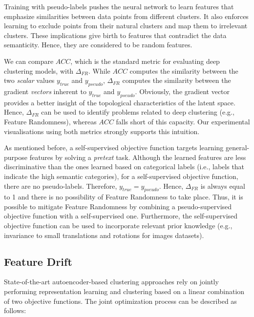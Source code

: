 \documentclass{article}
\begin{document}
Training with pseudo-labels pushes the neural network to learn features that emphasize similarities between data points from different clusters. It also enforces learning to exclude points from their natural clusters and map them to irrelevant clusters. These implications give birth to features that contradict the data semanticity. Hence, they are considered to be random features. 

We can compare $ACC$, which is the standard metric for evaluating deep clustering models, with $\Delta_{FR}$. While $ACC$ computes the similarity between the two \textit{scalar} values $y_{true}$ and $y_{pseudo}$,  $\Delta_{FR}$ computes the similarity between the gradient \textit{vectors} inherent to $y_{true}$ and $y_{pseudo}$. Obviously, the gradient vector provides a better insight of the topological characteristics of the latent space. Hence, $\Delta_{FR}$ can be used to identify problems related to deep clustering (e.g., Feature Randomness), whereas $ACC$ falls short of this capacity. Our experimental visualisations using both metrics strongly supports this intuition.

As mentioned before, a self-supervised objective function targets learning general-purpose features by solving a \textit{pretext} task. Although the learned features are less discriminative than the ones learned based on categorical labels (i.e., labels that indicate the high semantic categories), for a self-supervised objective function, there are no pseudo-labels. Therefore, $y_{true} = y_{pseudo}$. Hence,  $\Delta_{FR}$ is always equal to 1 and there is no possibility of Feature Randomness to take place. Thus, it is possible to mitigate Feature Randomness by combining a pseudo-supervised objective function with a self-supervised one. Furthermore, the self-supervised objective function can be used to incorporate relevant prior knowledge (e.g., invariance to small translations and rotations for images datasets). 






\subsection{Feature Drift}

State-of-the-art autoencoder-based clustering approaches rely on jointly performing representation learning and clustering based on a linear combination of two objective functions. The joint optimization process can be described as follows:
\end{document}

